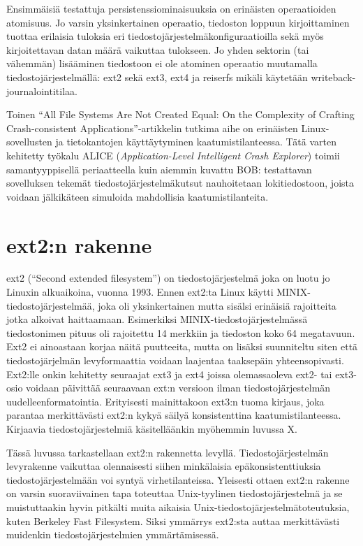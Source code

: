Ensimmäisiä testattuja persistenssiominaisuuksia on erinäisten operaatioiden atomisuus.
Jo varsin yksinkertainen operaatio, tiedoston loppuun kirjoittaminen tuottaa erilaisia tuloksia eri tiedostojärjestelmäkonfiguraatioilla
sekä myös kirjoitettavan datan määrä vaikuttaa tulokseen.
Jo yhden sektorin (tai vähemmän) lisääminen tiedostoon ei ole atominen operaatio muutamalla tiedostojärjestelmällä: ext2 sekä
ext3, ext4 ja reiserfs mikäli käytetään writeback-journalointitilaa.

Toinen ``All File Systems Are Not Created Equal: On the Complexity of Crafting Crash-consistent Applications''-artikkelin tutkima aihe on erinäisten Linux-sovellusten ja tietokantojen käyttäytyminen kaatumistilanteessa.
Tätä varten kehitetty työkalu ALICE (\emph{Application-Level Intelligent Crash Explorer}) toimii samantyyppisellä periaatteella kuin aiemmin kuvattu BOB:
testattavan sovelluksen tekemät tiedostojärjestelmäkutsut nauhoitetaan lokitiedostoon,
joista voidaan jälkikäteen simuloida mahdollisia kaatumistilanteita.

\section{ext2:n rakenne}
ext2 (``Second extended filesystem'')  on tiedostojärjestelmä joka on luotu jo Linuxin alkuaikoina, vuonna 1993.
Ennen ext2:ta Linux käytti MINIX-tiedostojärjestelmää,
joka oli yksinkertainen mutta sisälsi erinäisiä rajoitteita jotka alkoivat haittaamaan.
Esimerkiksi MINIX-tiedostojärjestelmässä tiedostonimen pituus oli rajoitettu 14 merkkiin
ja tiedoston koko 64 megatavuun.
Ext2 ei ainoastaan korjaa näitä puutteeita,
mutta on lisäksi suunniteltu siten että tiedostojärjelmän levyformaattia voidaan laajentaa taaksepäin yhteensopivasti.
Ext2:lle onkin kehitetty seuraajat ext3 ja ext4 joissa olemassaoleva ext2- tai ext3-osio voidaan päivittää seuraavaan
ext:n versioon ilman tiedostojärjestelmän uudelleenformatointia.
Erityisesti mainittakoon ext3:n tuoma kirjaus, joka parantaa merkittävästi ext2:n kykyä säilyä konsistenttina kaatumistilanteessa.
Kirjaavia tiedostojärjestelmiä käsitelläänkin myöhemmin luvussa X.

Tässä luvussa tarkastellaan ext2:n rakennetta levyllä.
Tiedostojärjestelmän levyrakenne vaikuttaa olennaisesti siihen minkälaisia epäkonsistenttiuksia tiedostojärjestelmään voi syntyä virhetilanteissa.
Yleisesti ottaen ext2:n rakenne on varsin suoraviivainen tapa toteuttaa Unix-tyylinen tiedostojärjestelmä ja se muistuttaakin hyvin pitkälti muita aikaisia Unix-tiedostojärjestelmätoteutuksia, kuten Berkeley Fast Filesystem.
Siksi ymmärrys ext2:sta auttaa merkittävästi muidenkin tiedostojärjestelmien ymmärtämisessä.

